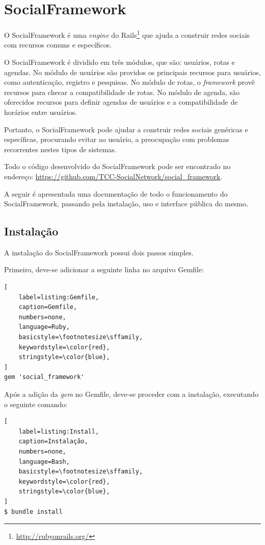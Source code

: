 \chapter{SocialFramework}
\label{chapter:SocialFramework}

O SocialFramework é uma \textit{engine} do Rails\footnote{\url{http://rubyonrails.org/}} que ajuda a construir redes sociais com recursos comuns e específicos.

O SocialFramework é dividido em três módulos, que são: usuários, rotas e agendas. No módulo de usuários são providos os principais recursos para usuários, como autenticação, registro e pesquisas. No módulo de rotas, o \textit{framework} provê recursos para checar a compatibilidade de rotas. No módulo de agenda, são oferecidos recursos para definir agendas de usuários e a compatibilidade de horários entre usuários.

Portanto, o SocialFramework pode ajudar a construir redes sociais genéricas e específicas, procurando evitar ao usuário, a preocupação com problemas recorrentes nestes tipos de sistemas.

Todo o código desenvolvido do SocialFramework pode ser encontrado no endereço: \url{https://github.com/TCC-SocialNetwork/social_framework}.

A seguir é apresentada uma documentação de todo o funcionamento do SocialFramework, passando pela instalação, uso e interface pública do mesmo.

\section{Instalação}

A instalação do SocialFramework possui dois passos simples.

Primeiro, deve-se adicionar a seguinte linha no arquivo Gemfile:

\begin{lstlisting}[
    label=listing:Gemfile,
    caption=Gemfile,
    numbers=none,
    language=Ruby,
    basicstyle=\footnotesize\sffamily,
    keywordstyle=\color{red},
    stringstyle=\color{blue},
]
gem 'social_framework'
\end{lstlisting}

Após a adição da \textit{gem} no Gemfile, deve-se proceder com a instalação, executando o seguinte comando:

\begin{lstlisting}[
    label=listing:Install,
    caption=Instalação,
    numbers=none,
    language=Bash,
    basicstyle=\footnotesize\sffamily,
    keywordstyle=\color{red},
    stringstyle=\color{blue},
]
$ bundle install
\end{lstlisting}

